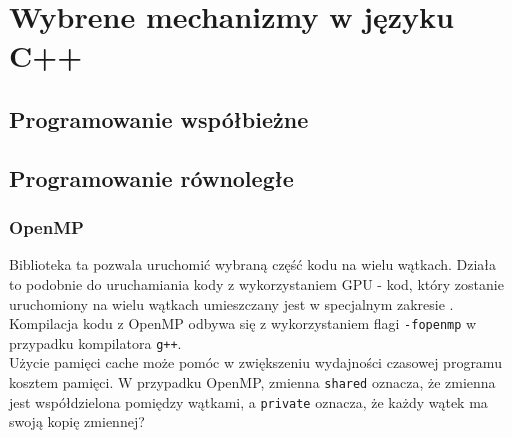 \chapter{Wybrene mechanizmy w języku C++}
\section{Programowanie współbieżne}


\section{Programowanie równoległe}

\subsection{OpenMP}
Biblioteka ta pozwala uruchomić wybraną część kodu na wielu wątkach. Działa to podobnie do uruchamiania kody z wykorzystaniem GPU - kod, który zostanie uruchomiony na wielu wątkach umieszczany jest w specjalnym zakresie . 
Kompilacja kodu z OpenMP odbywa się z wykorzystaniem flagi \texttt{-fopenmp} w przypadku kompilatora \texttt{g++}.\\
Użycie pamięci cache może pomóc w zwiększeniu wydajności czasowej programu kosztem pamięci. W przypadku OpenMP, zmienna \texttt{shared} oznacza, że zmienna jest współdzielona pomiędzy wątkami, a \texttt{private} oznacza, że każdy wątek ma swoją kopię zmiennej?\\
